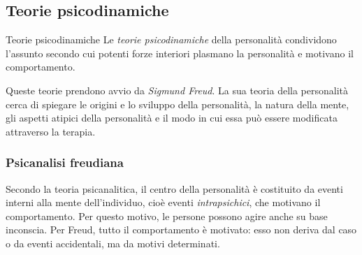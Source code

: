 \documentclass[a4paper]{article}
\begin{document}
\subsection{Teorie psicodinamiche}
\begin{snippetdefinition}{Teorie psicodinamiche}
    Le \emph{teorie psicodinamiche} della personalità condividono l'assunto secondo cui potenti forze interiori plasmano la personalità e motivano il comportamento.
\end{snippetdefinition}
Queste teorie prendono avvio da \emph{Sigmund Freud}. La sua teoria della personalità cerca di spiegare le origini e lo sviluppo della personalità, la natura della mente, gli aspetti atipici della personalità e il modo in cui essa può essere modificata attraverso la terapia.
\subsubsection{Psicanalisi freudiana}
Secondo la teoria psicanalitica, il centro della personalità è costituito da eventi interni alla mente dell'individuo, cioè eventi \emph{intrapsichici}, che motivano il comportamento. Per questo motivo, le persone possono agire anche su base inconscia.
Per Freud, tutto il comportamento è motivato: esso non deriva dal caso o da eventi accidentali, ma da motivi determinati.
\end{document}
